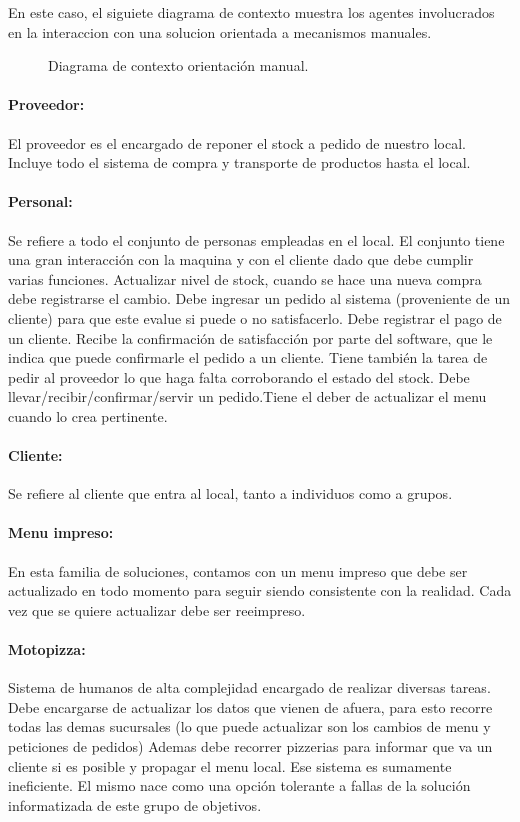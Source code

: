 \documentclass[a4paper,10pt]{article}
\begin{document}
En este caso, el siguiete diagrama de contexto muestra los agentes involucrados en la interaccion con una solucion orientada a mecanismos manuales.

\begin{figure}[H]
\centering
{}
\caption{Diagrama de contexto orientación manual.}
\end{figure}

\paragraph{Proveedor:}
El proveedor es el encargado de reponer el stock a pedido de nuestro local. Incluye todo el sistema de compra y transporte de productos hasta el local.
\\
\paragraph{Personal:}
Se refiere a todo el conjunto de personas empleadas en el local. El conjunto tiene una gran interacción con la maquina y con el cliente dado que debe cumplir varias funciones. Actualizar nivel de stock, cuando se hace una nueva compra debe registrarse el cambio. Debe ingresar un pedido al sistema (proveniente de un cliente) para que este evalue si puede o no satisfacerlo. Debe registrar el pago de un cliente. Recibe la confirmación de satisfacción por parte del software, que le indica que puede confirmarle el pedido a un cliente. Tiene también la tarea de pedir al proveedor lo que haga falta corroborando el estado del stock. Debe llevar/recibir/confirmar/servir un pedido.Tiene el deber de actualizar el menu cuando lo crea pertinente.
\\
\paragraph{Cliente:}
Se refiere al cliente que entra al local, tanto a individuos como a grupos.
\\
\paragraph{Menu impreso:}
En esta familia de soluciones, contamos con un menu impreso que debe ser actualizado en todo momento para seguir siendo consistente con la realidad. Cada vez que se quiere actualizar debe ser reeimpreso.
\\
\paragraph{Motopizza:}
Sistema de humanos de alta complejidad encargado de realizar diversas tareas. Debe encargarse de actualizar los datos que vienen de afuera, para esto recorre todas las demas sucursales (lo que puede actualizar son los cambios de menu y peticiones de pedidos) Ademas debe recorrer pizzerias para informar que va un cliente si es posible y propagar el menu local. Ese sistema es sumamente ineficiente.
El mismo nace como una opci\'on tolerante a fallas de la soluci\'on informatizada de este grupo de objetivos.
\end{document}
